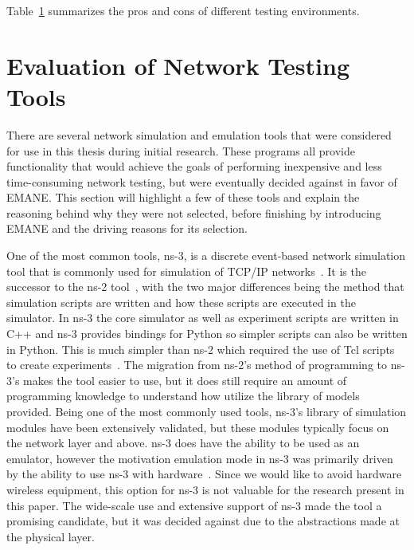 \begin{table}[!ht]
\begin{adjustbox}{width=\textwidth, center=\textwidth}
\begin{tabular}{|l|l|l|}
			\hline
		\end{tabular}
	\end{adjustbox}
	\label{simtable}
\end{table}

Table~\ref{simtable} summarizes the pros and cons of different testing environments.

\section{Evaluation of Network Testing Tools} %
There are several network simulation and emulation tools that were considered for use in this thesis during initial research.
These programs all provide functionality that would achieve the goals of performing inexpensive and less time-consuming network testing, but were eventually decided against in favor of EMANE.
This section will highlight a few of these tools and explain the reasoning behind why they were not selected, before finishing by introducing EMANE and the driving reasons for its selection.\par

One of the most common tools, ns-3, is a discrete event-based network simulation tool that is commonly used for simulation of TCP/IP networks~\cite{ns3}.
It is the successor to the ns-2 tool~\cite{ns2}, with the two major differences being the method that simulation scripts are written and how these scripts are executed in the simulator.
In ns-3 the core simulator as well as experiment scripts are written in C++ and ns-3 provides bindings for Python so simpler scripts can also be written in Python.
This is much simpler than ns-2 which required the use of Tcl scripts to create experiments~\cite{ns2_ns3}.
The migration from ns-2's method of programming to ns-3's makes the tool easier to use, but it does still require an amount of programming knowledge to understand how utilize the library of models provided.
Being one of the most commonly used tools, ns-3's library of simulation modules have been extensively validated, but these modules typically focus on the network layer and above.
ns-3 does have the ability to be used as an emulator, however the motivation emulation mode in ns-3 was primarily driven by the ability to use ns-3 with hardware~\cite{ns3_orbit}.
Since we would like to avoid hardware wireless equipment, this option for ns-3 is not valuable for the research present in this paper.
The wide-scale use and extensive support of ns-3 made the tool a promising candidate, but it was decided against due to the abstractions made at the physical layer.\par

